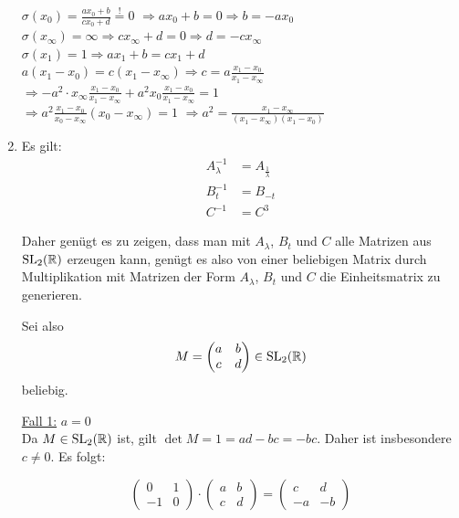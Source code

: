 \begin{beweis}
\begin{enumerate}[label=\alph*)]
              $\sigma(x_0) = \frac{ax_0 + b}{c x_0 + d} \overset{!}{=} 0$
              $\Rightarrow a x_0 + b = 0 \Rightarrow b = -a x_0$\\
              $\sigma(x_\infty) = \infty \Rightarrow c x_\infty + d = 0 \Rightarrow d = - c x_\infty$\\
              $\sigma(x_1) = 1 \Rightarrow a x_1 + b = c x_1 + d$\\
              $a (x_1 - x_0) = c (x_1 - x_\infty) \Rightarrow c = a \frac{x_1 - x_0}{x_1 - x_\infty}$\\
              $\Rightarrow - a^2 \cdot x_\infty \frac{x_1 - x_0}{x_1 - x_\infty} + a^2 x_0 \frac{x_1 - x_0}{x_1 - x_\infty} = 1$\\
              $\Rightarrow a^2 \frac{x_1 - x_0}{x_0 - x_\infty} (x_0 - x_\infty) = 1$
              $\Rightarrow a^2 = \frac{x_1 - x_\infty}{(x_1 - x_\infty) (x_1 - x_0)}$
        \item Es gilt:
              \begin{align*}
                A_{\lambda}^{-1} &= A_{\frac{1}{\lambda}}\\
                B_t^{-1}         &= B_{-t}\\
                C^{-1}           &= C^3
              \end{align*}

              Daher genügt es zu zeigen, dass man mit $A_{\lambda}$, $B_t$ und $C$ alle Matrizen
              aus $\mathrm{SL}_2(\mathbb{R})$ erzeugen kann, genügt es also von einer beliebigen
              Matrix durch Multiplikation mit Matrizen der Form $A_{\lambda}$, 
              $B_t$ und $C$ die Einheitsmatrix zu generieren.

              Sei also
              \[M = \begin{pmatrix} a & b\\ c & d\end{pmatrix} \in \mathrm{SL}_2(\mathbb{R})\]
              beliebig.

              \underline{Fall 1:} $a = 0$\\
              Da $M \in \mathrm{SL}_2(\mathbb{R})$ ist, gilt $\det{M} = 1 = ad - bc = -bc$.
              Daher ist insbesondere $c \neq 0$. Es folgt:

              \[\begin{pmatrix} 0 & 1\\ -1 & 0\end{pmatrix} \cdot \begin{pmatrix} a & b\\ c & d\end{pmatrix} = \begin{pmatrix} c & d\\ -a & -b\end{pmatrix}\]


\end{enumerate}
\end{beweis}
